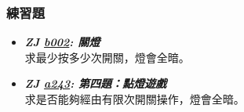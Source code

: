 \subsubsection*{練習題}
\begin{itemize}[label={\Checkmark}]
\item \textbf{\textit{ZJ \href{http://zerojudge.tw/ShowProblem?problemid=b002}{b002}: 關燈}}\\
求最少按多少次開關，燈會全暗。
\item \textbf{\textit{ZJ \href{http://zerojudge.tw/ShowProblem?problemid=a243}{a243}: 第四題：點燈遊戲}}\\
求是否能夠經由有限次開關操作，燈會全暗。
\end{itemize}